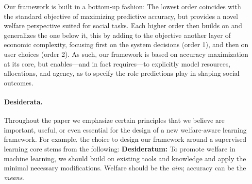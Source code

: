 {\begin{itemize}[leftmargin=1em,topsep=0em,itemsep=0.3em]

\end{itemize}

Our framework is built in a bottom-up fashion:
The lowest order coincides with the standard objective of maximizing predictive accuracy,
but provides a novel welfare perspective suited for social tasks.
Each higher order then builds on and generalizes the one below it,
this by adding to the objective another layer of economic complexity,
focusing first on the system decisions (order 1),
and then on user choices (order 2).
As such, our framework is based on accuracy maximization at its core,
but enables---and in fact requires---to explicitly model resources, allocations, and agency,
as to specify the role predictions play in
shaping social outcomes.


\paragraph{Desiderata.}
Throughout the paper we emphasize certain principles that we believe are important, useful, or even essential for the design of a new 
welfare-aware learning framework.
For example, the choice to design our framework around
a supervised learning core stems from the following:
\squeeze
\bbox
\textbf{Desideratum:} 
To promote welfare in machine learning,
we should build on existing tools and knowledge
and apply the minimal necessary modifications.
Welfare should be the \emph{aim}; accuracy can be the \emph{means}.
\ebox

}
